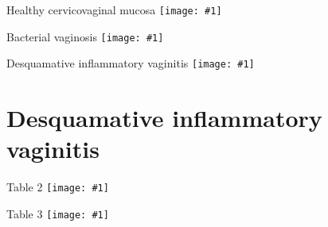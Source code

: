 \documentclass{beamer}
\newcommand*{\solo}[1]{\centering\texttt{[image: \#1]}}
\begin{document}
\begin{frame}{Healthy cervicovaginal mucosa}
    \solo{F1a.jpg}
\end{frame}

\begin{frame}{Bacterial vaginosis}
    \solo{F1c.jpg}
\end{frame}

\begin{frame}{Desquamative inflammatory vaginitis}
    \solo{F1e.jpg}
\end{frame}

\section{Desquamative inflammatory vaginitis}

\begin{frame}{Table 2}
    \solo{T2.eps}
\end{frame}

\begin{frame}{Table 3}
    \solo{T3.eps}
\end{frame}
\end{document}
